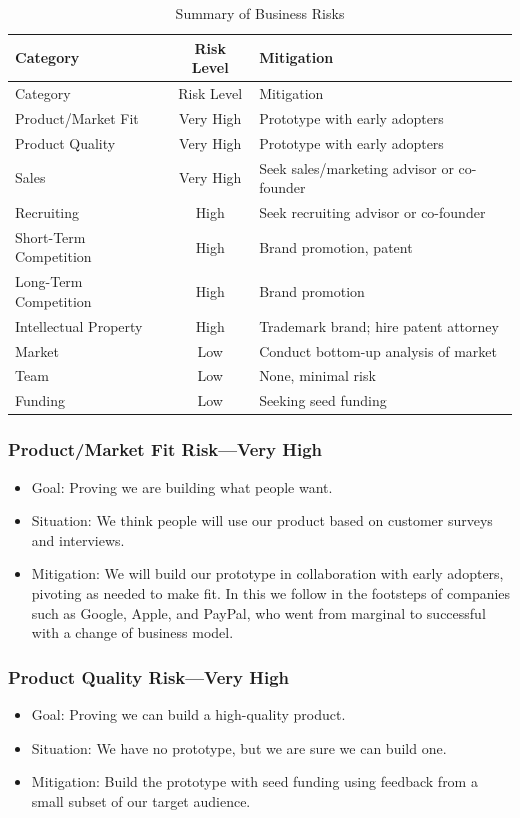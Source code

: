 \documentclass[10pt,openany]{book}
\providecommand{\tightlist}{%
  \setlength{\itemsep}{0pt}\setlength{\parskip}{0pt}}
\begin{document}
\newpage

\begin{longtable}[]{@{}lcl@{}}
\caption{Summary of Business Risks}\tabularnewline
\toprule
Category & Risk Level & Mitigation\tabularnewline
\midrule
\endfirsthead
\toprule
Category & Risk Level & Mitigation\tabularnewline
\midrule
\endhead
Product/Market Fit & Very High & Prototype with early
adopters\tabularnewline
Product Quality & Very High & Prototype with early
adopters\tabularnewline
Sales & Very High & Seek sales/marketing advisor or
co-founder\tabularnewline
Recruiting & High & Seek recruiting advisor or co-founder\tabularnewline
Short-Term Competition & High & Brand promotion, patent\tabularnewline
Long-Term Competition & High & Brand promotion\tabularnewline
Intellectual Property & High & Trademark brand; hire patent
attorney\tabularnewline
Market & Low & Conduct bottom-up analysis of market\tabularnewline
Team & Low & None, minimal risk\tabularnewline
Funding & Low & Seeking seed funding\tabularnewline
\bottomrule
\end{longtable}

\hypertarget{productmarket-fit-riskvery-high}{%
\subsubsection{Product/Market Fit Risk---Very
High}\label{productmarket-fit-riskvery-high}}

\begin{itemize}
\tightlist
\item
  Goal: Proving we are building what people want.
\item
  Situation: We think people will use our product based on customer
  surveys and interviews.
\item
  Mitigation: We will build our prototype in collaboration with early
  adopters, pivoting as needed to make fit. In this we follow in the
  footsteps of companies such as Google, Apple, and PayPal, who went
  from marginal to successful with a change of business model.
\end{itemize}

\hypertarget{product-quality-riskvery-high}{%
\subsubsection{Product Quality Risk---Very
High}\label{product-quality-riskvery-high}}

\begin{itemize}
\tightlist
\item
  Goal: Proving we can build a high-quality product.
\item
  Situation: We have no prototype, but we are sure we can build one.
\item
  Mitigation: Build the prototype with seed funding using feedback from
  a small subset of our target audience.
\end{itemize}
\end{document}
